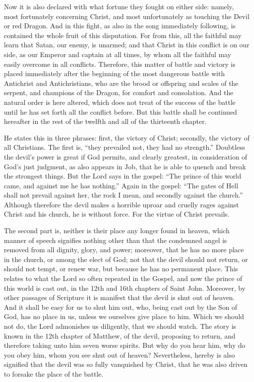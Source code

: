 Now it is also declared with what fortune they fought on either side: namely, most fortunately concerning Christ, and most unfortunately as touching the Devil or red Dragon. And in this fight, as also in the song immediately following, is contained the whole fruit of this disputation. For from this, all the faithful may learn that Satan, our enemy, is unarmed; and that Christ in this conflict is on our side, as our Emperor and captain at all times, by whom all the faithful may easily overcome in all conflicts. Therefore, this matter of battle and victory is placed immediately after the beginning of the most dangerous battle with Antichrist and Antichristians, who are the brood or offspring and scales of the serpent, and champions of the Dragon, for comfort and consolation. And the natural order is here altered, which does not treat of the success of the battle until he has set forth all the conflict before. But this battle shall be continued hereafter in the rest of the twelfth and all of the thirteenth chapter.

He states this in three phrases: first, the victory of Christ; secondly, the victory of all Christians. The first is, “they prevailed not, they had no strength.” Doubtless the devil’s power is great if God permits, and clearly greatest, in consideration of God’s just judgment, as also appears in Job, that he is able to quench and break the strongest things. But the Lord says in the gospel: “The prince of this world came, and against me he has nothing.” Again in the gospel: “The gates of Hell shall not prevail against her, the rock I mean, and secondly against the church.” Although therefore the devil makes a horrible uproar and cruelly rages against Christ and his church, he is without force. For the virtue of Christ prevails.

The second part is, neither is their place any longer found in heaven, which manner of speech signifies nothing other than that the condemned angel is removed from all dignity, glory, and power; moreover, that he has no more place in the church, or among the elect of God; not that the devil should not return, or should not tempt, or renew war, but because he has no permanent place. This relates to what the Lord so often repeated in the Gospel, and now the prince of this world is cast out, in the 12th and 16th chapters of Saint John. Moreover, by other passages of Scripture it is manifest that the devil is shut out of heaven. And it shall be easy for us to shut him out, who, being cast out by the Son of God, has no place in us, unless we ourselves give place to him. Which we should not do, the Lord admonishes us diligently, that we should watch. The story is known in the 12th chapter of Matthew, of the devil, proposing to return, and therefore taking unto him seven worse spirits. But why do you hear him, why do you obey him, whom you see shut out of heaven? Nevertheless, hereby is also signified that the devil was so fully vanquished by Christ, that he was also driven to forsake the place of the battle.

